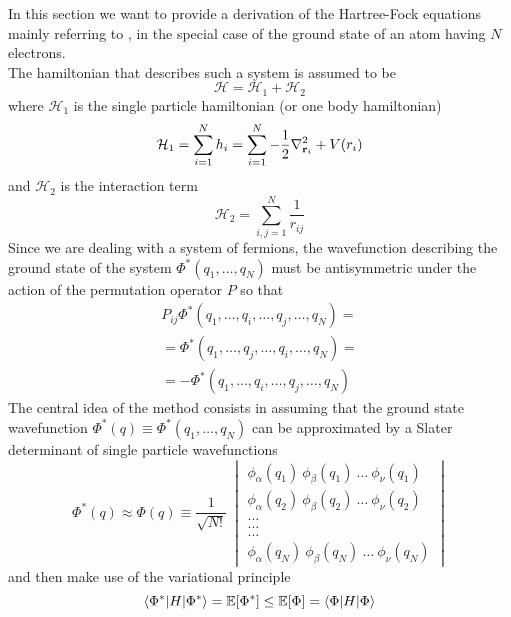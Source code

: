 In this section we want to provide a derivation of the Hartree-Fock equations mainly referring to \cite{bransden}, in the special case of the ground state of an atom having $N$ electrons. \\
The hamiltonian that describes such a system is assumed to be 
\begin{equation*}
    \mathcal{H} = \mathcal{H}_1 + \mathcal{H}_2
\end{equation*}
where $\mathcal{H}_1$ is the single particle hamiltonian (or one body hamiltonian)
\begin{equation*}
    \mathcal{H}_1 = \sum_{i=1}^N h_i = \sum_{i=1}^N -\frac{1}{2}\nabla_{\mathbf{r}_i}^2 + V(r_i)
\end{equation*}
and $\mathcal{H}_2$ is the interaction term
\begin{equation*}
    \mathcal{H}_2 = \sum_{i, j = 1}^N \frac{1}{r_{ij}}
\end{equation*}
Since we are dealing with a system of fermions, the wavefunction describing the ground state of the system $\Phi^*(q_1, \dots, q_N)$ must be antisymmetric under the action of the permutation operator $P$ so that
\begin{gather*}
    P_{ij} \Phi^*(q_1, \dots,q_i, \dots, q_j, \dots, q_N) = \\
    = \Phi^*(q_1, \dots, q_j, \dots, q_i, \dots, q_N) = \\ 
    = - \Phi^*(q_1, \dots, q_i, \dots, q_j, \dots, q_N) 
\end{gather*}
The central idea of the method consists in assuming that the ground state wavefunction $\Phi^*(q) \equiv \Phi^*(q_1, \dots, q_N)$ can be approximated by a Slater determinant of single particle wavefunctions
\begin{equation*}
    \Phi^*(q) \approx \Phi(q) \equiv \frac{1}{\sqrt{N!}} \ \begin{vmatrix} \phi_{\alpha}(q_1) \ \phi_{\beta}(q_1) \ \dots \ \phi_{\nu}(q_1) \\ 
    \phi_{\alpha}(q_2) \ \phi_{\beta}(q_2) \ \dots \ \phi_{\nu}(q_2) \\
    \dots \\
    \dots \\
    \dots \\
    \phi_{\alpha}(q_N) \ \phi_{\beta}(q_N) \ \dots \ \phi_{\nu}(q_N)
    \end{vmatrix}
\end{equation*}
and then make use of the variational principle
\begin{equation}
    \bracketOP{\Phi^*}{\Phi^*}{H} = \mathbb{E}[\Phi^*] \leq \mathbb{E}[\Phi] = \bracketOP{\Phi}{\Phi}{H}
    \label{eq:en_ground_slater_1}
\end{equation}
